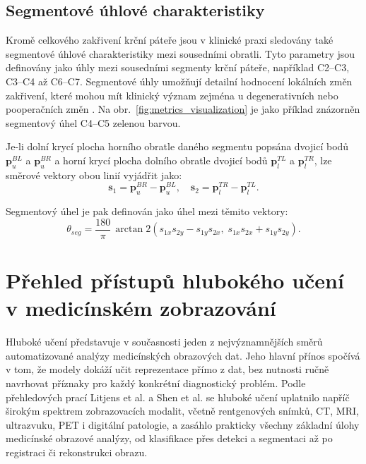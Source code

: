 \documentclass[male,czech,api_bc]{kitheses}
\begin{document}
\section*{Segmentové úhlové charakteristiky}

Kromě celkového zakřivení krční páteře jsou v klinické praxi sledovány také segmentové úhlové charakteristiky mezi sousedními obratli. Tyto parametry jsou definovány jako úhly mezi sousedními segmenty krční páteře, například C2--C3, C3--C4 až C6--C7. Segmentové úhly umožňují detailní hodnocení lokálních změn zakřivení, které mohou mít klinický význam zejména u degenerativních nebo pooperačních změn \cite{Bolcha2025}. Na obr.~\ref{fig:metrics_visualization} je jako příklad znázorněn segmentový úhel C4--C5 zelenou barvou.

Je-li dolní krycí plocha horního obratle daného segmentu popsána dvojicí bodů $\mathbf{p}_{u}^{BL}$ a $\mathbf{p}_{u}^{BR}$ a horní krycí plocha dolního obratle dvojicí bodů $\mathbf{p}_{l}^{TL}$ a $\mathbf{p}_{l}^{TR}$, lze směrové vektory obou linií vyjádřit jako:
\begin{equation}
\mathbf{s}_1 = \mathbf{p}_{u}^{BR} - \mathbf{p}_{u}^{BL}, \quad
\mathbf{s}_2 = \mathbf{p}_{l}^{TR} - \mathbf{p}_{l}^{TL}.
\end{equation}

Segmentový úhel je pak definován jako úhel mezi těmito vektory:
\begin{equation}
\theta_{seg} = \frac{180}{\pi}\,\arctan2(s_{1x}s_{2y} - s_{1y}s_{2x}, \; s_{1x}s_{2x} + s_{1y}s_{2y}).
\end{equation}

\chapter{Přehled přístupů hlubokého učení v medicínském zobrazování}

Hluboké učení představuje v současnosti jeden z nejvýznamnějších směrů automatizované analýzy medicínských obrazových dat. Jeho hlavní přínos spočívá v tom, že modely dokáží učit reprezentace přímo z dat, bez nutnosti ručně navrhovat příznaky pro každý konkrétní diagnostický problém. Podle přehledových prací Litjens et al. a Shen et al. se hluboké učení uplatnilo napříč širokým spektrem zobrazovacích modalit, včetně rentgenových snímků, CT, MRI, ultrazvuku, PET i digitální patologie, a zasáhlo prakticky všechny základní úlohy medicínské obrazové analýzy, od klasifikace přes detekci a segmentaci až po registraci či rekonstrukci obrazu.\cite{Litjens2017,Shen2017}
\end{document}
